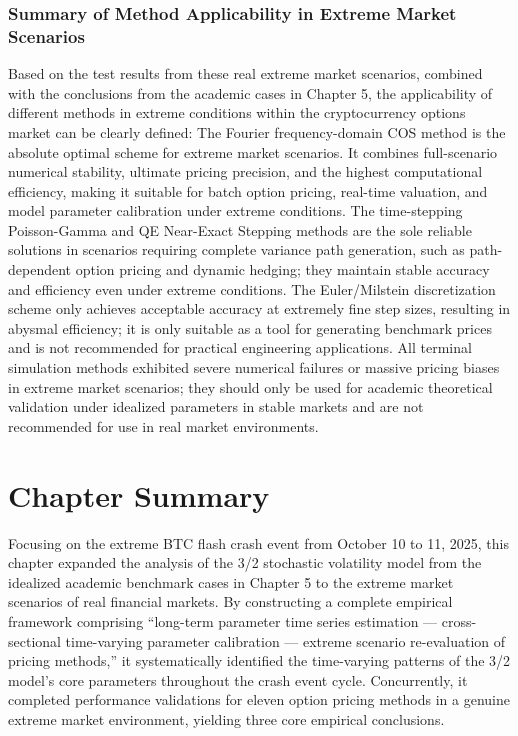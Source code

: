 \subsubsection{Summary of Method Applicability in Extreme Market Scenarios}
Based on the test results from these real extreme market scenarios, combined with the conclusions from the academic cases in Chapter 5, the applicability of different methods in extreme conditions within the cryptocurrency options market can be clearly defined: The Fourier frequency-domain COS method is the absolute optimal scheme for extreme market scenarios. It combines full-scenario numerical stability, ultimate pricing precision, and the highest computational efficiency, making it suitable for batch option pricing, real-time valuation, and model parameter calibration under extreme conditions. The time-stepping Poisson-Gamma and QE Near-Exact Stepping methods are the sole reliable solutions in scenarios requiring complete variance path generation, such as path-dependent option pricing and dynamic hedging; they maintain stable accuracy and efficiency even under extreme conditions. The Euler/Milstein discretization scheme only achieves acceptable accuracy at extremely fine step sizes, resulting in abysmal efficiency; it is only suitable as a tool for generating benchmark prices and is not recommended for practical engineering applications. All terminal simulation methods exhibited severe numerical failures or massive pricing biases in extreme market scenarios; they should only be used for academic theoretical validation under idealized parameters in stable markets and are not recommended for use in real market environments.

\section{Chapter Summary}
Focusing on the extreme BTC flash crash event from October 10 to 11, 2025, this chapter expanded the analysis of the 3/2 stochastic volatility model from the idealized academic benchmark cases in Chapter 5 to the extreme market scenarios of real financial markets. By constructing a complete empirical framework comprising ``long-term parameter time series estimation — cross-sectional time-varying parameter calibration — extreme scenario re-evaluation of pricing methods,'' it systematically identified the time-varying patterns of the 3/2 model's core parameters throughout the crash event cycle. Concurrently, it completed performance validations for eleven option pricing methods in a genuine extreme market environment, yielding three core empirical conclusions.

